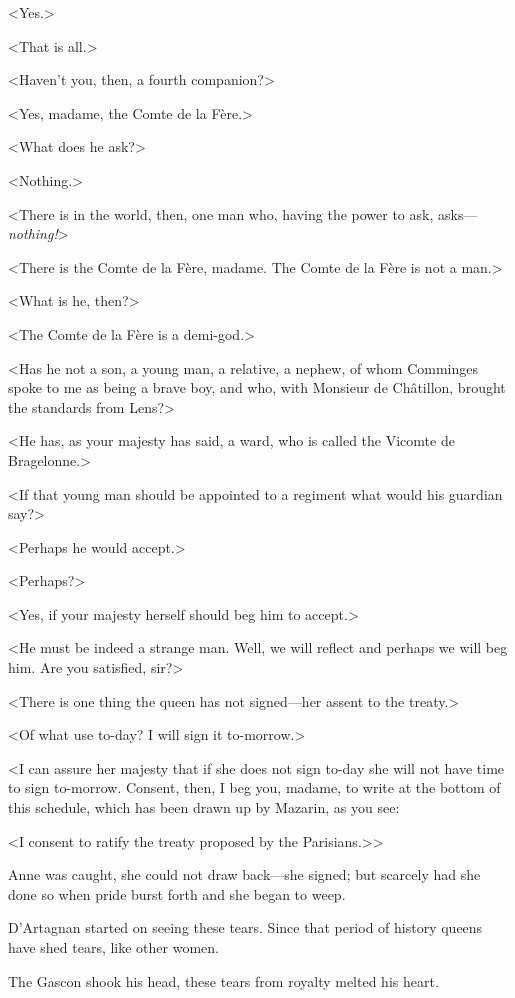 <Yes.>

<That is all.>

<Haven't you, then, a fourth companion?>

<Yes, madame, the Comte de la Fère.>

<What does he ask?>

<Nothing.>

<There is in the world, then, one man who, having the power to ask, asks—\emph{nothing!}>

<There is the Comte de la Fère, madame. The Comte de la Fère is not a man.>

<What is he, then?>

<The Comte de la Fère is a demi-god.>

<Has he not a son, a young man, a relative, a nephew, of whom Comminges spoke to me as being a brave boy, and who, with Monsieur de Châtillon, brought the standards from Lens?>

<He has, as your majesty has said, a ward, who is called the Vicomte de Bragelonne.>

<If that young man should be appointed to a regiment what would his guardian say?>

<Perhaps he would accept.>

<Perhaps?>

<Yes, if your majesty herself should beg him to accept.>

<He must be indeed a strange man. Well, we will reflect and perhaps we will beg him. Are you satisfied, sir?>

<There is one thing the queen has not signed—her assent to the treaty.>

<Of what use to-day? I will sign it to-morrow.>

<I can assure her majesty that if she does not sign to-day she will not have time to sign to-morrow. Consent, then, I beg you, madame, to write at the bottom of this schedule, which has been drawn up by Mazarin, as you see:

<I consent to ratify the treaty proposed by the Parisians.>>

Anne was caught, she could not draw back—she signed; but scarcely had she done so when pride burst forth and she began to weep.

D'Artagnan started on seeing these tears. Since that period of history queens have shed tears, like other women.

The Gascon shook his head, these tears from royalty melted his heart.

